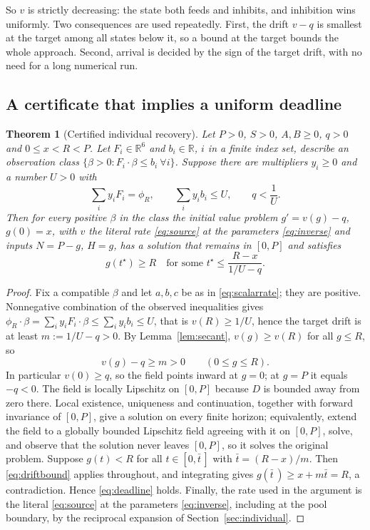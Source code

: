 \documentclass[11pt]{article}
\newtheorem{theorem}{Theorem}[section]
\theoremstyle{definition}
\newcommand{\R}{\mathbb R}
\begin{document}
So $v$ is strictly decreasing: the state both feeds and inhibits, and
inhibition wins uniformly. Two consequences are used repeatedly. First, the
drift $v-q$ is smallest at the target among all states below it, so a bound at
the target bounds the whole approach. Second, arrival is decided by the sign of
the target drift, with no need for a long numerical run.

\subsection{A certificate that implies a uniform deadline}

\begin{theorem}[Certified individual recovery]\label{thm:individual}
Let $P>0$, $S>0$, $A,B\ge0$, $q>0$ and $0\le x<R<P$. Let $F_i\in\R^6$ and
$b_i\in\R$, $i$ in a finite index set, describe an observation class
$\{\beta>0:F_i\cdot\beta\le b_i\ \forall i\}$. Suppose there are multipliers
$y_i\ge0$ and a number $U>0$ with
\begin{equation}\label{eq:cert}
  \sum_iy_iF_i=\phi_R,\qquad \sum_iy_ib_i\le U,\qquad q<\frac1U .
\end{equation}
Then for \emph{every} positive $\beta$ in the class the initial value problem
$g'=v(g)-q$, $g(0)=x$, with $v$ the literal rate \eqref{eq:source} at the
parameters \eqref{eq:inverse} and inputs $N=P-g$, $H=g$, has a solution that
remains in $[0,P]$ and satisfies
\begin{equation}\label{eq:deadline}
  g(t^\star)\ge R\quad\text{for some } t^\star\le\frac{R-x}{1/U-q}.
\end{equation}
\end{theorem}
\begin{proof}
Fix a compatible $\beta$ and let $a,b,c$ be as in \eqref{eq:scalarrate}; they
are positive. Nonnegative combination of the observed inequalities gives
$\phi_R\cdot\beta=\sum_iy_iF_i\cdot\beta\le\sum_iy_ib_i\le U$, that is
$v(R)\ge1/U$, hence the target drift is at least $m:=1/U-q>0$. By
Lemma~\ref{lem:secant}, $v(g)\ge v(R)$ for all $g\le R$, so
\begin{equation}\label{eq:driftbound}
  v(g)-q\ge m>0\qquad (0\le g\le R).
\end{equation}
In particular $v(0)\ge q$, so the field points inward at $g=0$; at $g=P$ it
equals $-q<0$. The field is locally Lipschitz on $[0,P]$ because $D$ is
bounded away from zero there. Local existence, uniqueness and continuation,
together with forward invariance of $[0,P]$, give a solution on every finite
horizon; equivalently, extend the field to a globally bounded Lipschitz field
agreeing with it on $[0,P]$, solve, and observe that the solution never leaves
$[0,P]$, so it solves the original problem. Suppose $g(t)<R$ for all
$t\in[0,\bar t\,]$ with $\bar t=(R-x)/m$. Then \eqref{eq:driftbound} applies
throughout, and integrating gives $g(\bar t\,)\ge x+m\bar t=R$, a
contradiction. Hence \eqref{eq:deadline} holds. Finally, the rate used in the
argument is the literal \eqref{eq:source} at the parameters \eqref{eq:inverse},
including at the pool boundary, by the reciprocal expansion of
Section~\ref{sec:individual}.
\end{proof}
\end{document}
